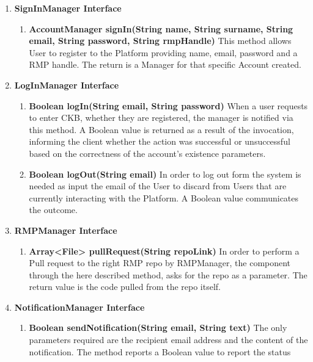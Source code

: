 \begin{enumerate}
    \item \textbf{SignInManager Interface} 
            \begin{enumerate}[label=$\bullet$]
                \item \textbf{AccountManager signIn(String name, String surname, String email, String password, String rmpHandle)} This method allows User to register to the Platform providing name, email, password and a RMP handle. 
                The return is a Manager for that specific Account created.
            \end{enumerate}
    \item \textbf{LogInManager Interface}
        \begin{enumerate}[label=$\bullet$]
            \item \textbf{Boolean logIn(String email, String password)} When a user requests to enter CKB, whether they are registered, the manager is notified via this method. A Boolean value is returned as a result of the 
            invocation, informing the client whether the action was successful or unsuccessful based on the correctness of the account's existence parameters.
            \item \textbf{Boolean logOut(String email)} In order to log out form the system is needed as input the email of the User to discard from Users that are currently interacting with the Platform. A Boolean value communicates 
            the outcome.
        \end{enumerate}
    \item \textbf{RMPManager Interface}
        \begin{enumerate}[label=$\bullet$]
            \item \textbf{Array<File> pullRequest(String repoLink)} In order to perform a Pull request to the right RMP repo by RMPManager, the component through the here described method, asks for the repo as a parameter. The return 
            value is the code pulled from the repo itself.
        \end{enumerate} 
    \item \textbf{NotificationManager Interface}
        \begin{enumerate}[label=$\bullet$]
            \item \textbf{Boolean sendNotification(String email, String text)} The only parameters required are the recipient email address and the content of the notification. The method reports a Boolean value to report the status 

\end{enumerate}
\end{enumerate}
